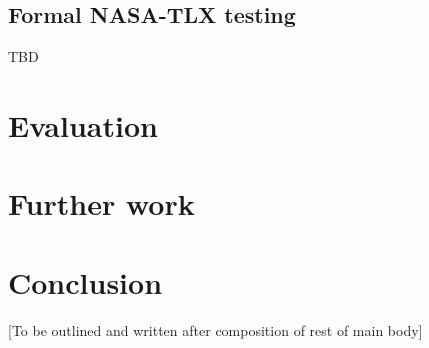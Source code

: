 \documentclass{article}
\begin{document}
\subsection{Formal NASA-TLX testing}
TBD


\section{Evaluation}


\section{Further work}


\section{Conclusion}
[To be outlined and written after composition of rest of main body]

\printbibliography
\end{document}
